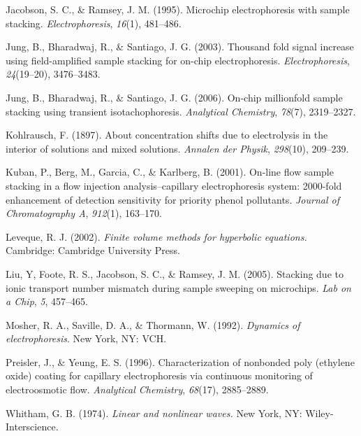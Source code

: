 \documentclass[lineno,authoryear]{FLO_v1}%
\theoremstyle{definition}
\begin{document}
\begin{Backmatter}
\begin{thebibliography}{}
Jacobson, S. C., {\&} Ramsey, J. M. (1995). Microchip
electrophoresis with sample stacking.
\textit{Electrophoresis}, \textit{16}(1), 481--486.

Jung, B., Bharadwaj, R., {\&} Santiago, J. G. (2003).
Thousand fold signal increase using field-amplified sample
stacking for on-chip electrophoresis.
\textit{Electrophoresis}, \textit{24}(19--20), 3476--3483.

Jung, B., Bharadwaj, R., {\&} Santiago, J. G. (2006).
On-chip millionfold sample stacking using transient
isotachophoresis. \textit{Analytical Chemistry},
\textit{78}(7), 2319--2327.

Kohlrausch, F. (1897). About concentration shifts due to
electrolysis in the interior of solutions and mixed
solutions. \textit{Annalen der Physik}, \textit{298}(10),
209--239.

Kuban, P., Berg, M., Garcia, C., {\&} Karlberg, B. (2001).
On-line flow sample stacking in a flow injection
analysis--capillary electrophoresis system: 2000-fold
enhancement of detection sensitivity for priority phenol
pollutants. \textit{Journal of Chromatography A},
\textit{912}(1), 163--170.

Leveque, R. J. (2002). \textit{Finite volume methods for
hyperbolic equations.} Cambridge: Cambridge University
Press.

Liu, Y, Foote, R. S., Jacobson, S. C., {\&} Ramsey, J. M.
(2005). Stacking due to ionic transport number mismatch
during sample sweeping on microchips. \textit{Lab on a
Chip}, \textit{5}, 457--465.

Mosher, R. A., Saville, D. A., {\&} Thormann, W. (1992).
\textit{Dynamics of electrophoresis}. New York, NY: VCH.

Preisler, J., {\&} Yeung, E. S. (1996). Characterization of
nonbonded poly (ethylene oxide) coating for capillary
electrophoresis via continuous monitoring of electroosmotic
flow. \textit{Analytical Chemistry}, \textit{68}(17),
2885--2889.

Whitham, G. B. (1974). \textit{Linear and nonlinear waves.}
New York, NY: Wiley-Interscience.
\end{thebibliography}

\end{Backmatter}
\end{document}
